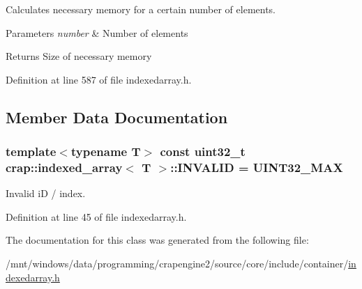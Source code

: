 Calculates necessary memory for a certain number of elements. 


\begin{DoxyParams}{Parameters}
{\em number} & Number of elements \\
\hline
\end{DoxyParams}
\begin{DoxyReturn}{Returns}
Size of necessary memory 
\end{DoxyReturn}


Definition at line 587 of file indexedarray.\+h.



\subsection{Member Data Documentation}
\hypertarget{classcrap_1_1indexed__array_aa3ba1587d20c46f7557a7cacaf4d9cd8}{}
\subsubsection[{I\+N\+V\+A\+L\+I\+D}]{\setlength{\rightskip}{0pt plus 5cm}template$<$typename T$>$ const uint32\+\_\+t {\bf crap\+::indexed\+\_\+array}$<$ T $>$\+::I\+N\+V\+A\+L\+I\+D = {\bf U\+I\+N\+T32\+\_\+\+M\+A\+X}\hspace{0.3cm}{\ttfamily [static]}}\label{classcrap_1_1indexed__array_aa3ba1587d20c46f7557a7cacaf4d9cd8}


Invalid i\+D / index. 



Definition at line 45 of file indexedarray.\+h.



The documentation for this class was generated from the following file\+:\begin{DoxyCompactItemize}
\item 
/mnt/windows/data/programming/crapengine2/source/core/include/container/\hyperlink{indexedarray_8h}{indexedarray.\+h}\end{DoxyCompactItemize}
